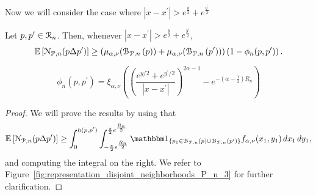 Now we will consider the case where $|x - x^\prime| > e^{\frac{y}{2}} + e^{\frac{y^\prime}{2}}$

\begin{lemma}\label{lem:disjoint_neighbors_P_n_large}
Let $p, p^\prime \in {\mathcal R}_n$. Then, whenever $|x - x^\prime| > e^{\frac{y}{2}} + e^{\frac{y^\prime}{2}}$,
\[
	\mathbb{E}\left[{\mathcal N}_{{\mathcal P},n}(p\Delta p^\prime)\right]
	\ge \left(\mu_{\alpha,\nu}({\mathcal B}_{{\mathcal P},n}\left(p\right)) + \mu_{\alpha,\nu}({\mathcal B}_{{\mathcal P},n}\left(p^\prime\right))\right)
		\left(1-\phi_n(p,p^\prime)\right).
\]

\[
	\phi_n(p,p^\prime) = \xi_{\alpha, \nu}\left( \left(\frac{e^{y/2} + e^{y^\prime/2}}{|x-x^\prime|}\right)^{2\alpha - 1}
	- e^{-(\alpha - \frac{1}{2})R_n}\right)
\]
\end{lemma}

\begin{proof}
We will prove the results by using that
\[
	\Exp{\Ncal_{\Pcal,n}(p\Delta p^\prime)} 
	\ge \int_0^{h(p,p^\prime)} \int_{-\frac{\pi}{2}e^{\frac{R_n}{2}}}^{\frac{\pi}{2}e^{\frac{R_n}{2}}} \ind{p_1 \in \BallPon{p} \cup \BallPon{p^\prime}} f_{\alpha,\nu}(x_1,y_1) \, dx_1 \, dy_1,
\]
and computing the integral on the right. We refer to Figure~\ref{fig:representation_disjoint_neighborhoods_P_n_3} for further clarification. 


\end{proof}
